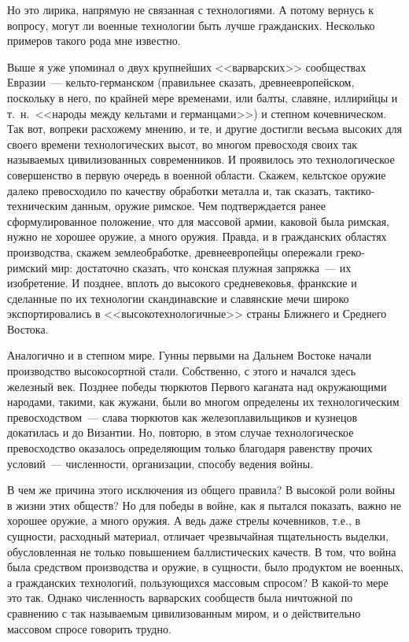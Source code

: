 Но это лирика, напрямую не связанная с технологиями. А потому вернусь к вопросу, могут ли военные технологии быть лучше гражданских. Несколько примеров такого рода мне известно. 

Выше я уже упоминал о двух крупнейших <<варварских>> сообществах Евразии~---  кельто-германском (правильнее сказать, древнеевропейском, поскольку в него, по крайней мере временами, или балты, славяне, иллирийцы и т.~н.~<<народы между кельтами и германцами>>) и степном кочевническом. Так вот, вопреки расхожему мнению, и те, и другие достигли весьма высоких для своего времени технологических высот, во многом превосходя своих так называемых цивилизованных современников. И проявилось это технологическое совершенство в первую очередь в военной области. Скажем, кельтское оружие далеко превосходило по качеству обработки металла и, так сказать, тактико-техническим данным, оружие римское. Чем подтверждается ранее сформулированное положение, что для массовой армии, каковой была римская, нужно не хорошее оружие, а много оружия. Правда, и в гражданских областях производства, скажем землеобработке, древнеевропейцы опережали греко-римский мир: достаточно сказать, что конская плужная запряжка~--- их изобретение. И позднее, вплоть до высокого средневековья, франкские и сделанные по их технологии скандинавские и славянские мечи широко экспортировались в <<высокотехнологичные>> страны Ближнего и Среднего Востока. 

Аналогично и в степном мире. Гунны первыми на Дальнем Востоке начали производство высокосортной стали. Собственно, с этого и начался здесь железный век. Позднее победы тюркютов Первого каганата над окружающими народами, такими, как жужани, были во многом определены их технологическим превосходством~--- слава тюркютов как железоплавильщиков и кузнецов докатилась и до Византии. Но, повторю, в этом случае технологическое превосходство оказалось определяющим только благодаря равенству прочих условий~--- численности, организации, способу ведения войны. 

В чем же причина этого исключения из общего правила? В высокой роли войны в жизни этих обществ? Но для победы в войне, как я пытался показать, важно не хорошее оружие, а много оружия. А ведь даже стрелы кочевников, т.е., в сущности, расходный материал, отличает чрезвычайная тщательность выделки, обусловленная не только повышением баллистических качеств. В том, что война была средством производства и оружие, в сущности, было продуктом не военных, а гражданских технологий, пользующихся массовым спросом? В какой-то мере это так. Однако численность варварских сообществ была ничтожной по сравнению с так называемым цивилизованным миром, и о действительно массовом спросе говорить трудно. 

